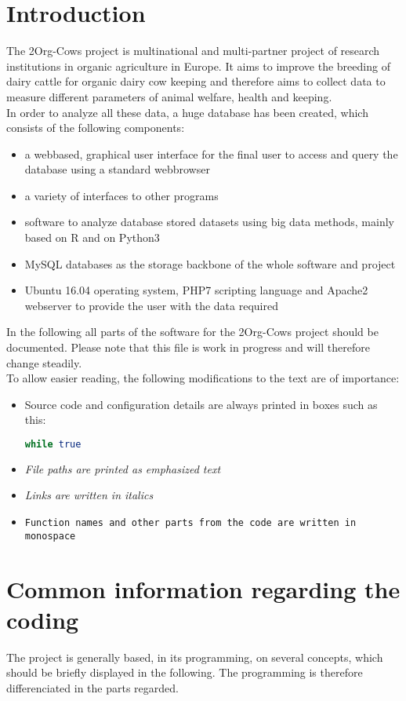 
\chapter{Introduction}

The 2Org-Cows project is multinational and multi-partner project of research institutions in organic agriculture in Europe. It aims to improve the breeding of dairy cattle for 
organic dairy cow keeping and therefore aims to collect data to measure different parameters of animal welfare, health and keeping.\\
In order to analyze all these data, a huge database has been created, which consists of the following components:
\begin{itemize}
 \item a webbased, graphical user interface for the final user to access and query the database using a standard webbrowser
 \item a variety of interfaces to other programs
 \item software to analyze database stored datasets using big data methods, mainly based on R and on Python3
 \item MySQL databases as the storage backbone of the whole software and project
 \item Ubuntu 16.04 operating system, PHP7 scripting language and Apache2 webserver to provide the user with the data required
\end{itemize}
In the following all parts of the software for the 2Org-Cows project should be documented. Please note that this file is work in progress and will therefore change steadily.\\
To allow easier reading, the following modifications to the text are of importance:
\begin{itemize}
\item Source code and configuration details are always printed in boxes such as this: 
  \begin{lstlisting}[language=bash] 
  while true 
  \end{lstlisting}
\item \emph{File paths are printed as emphasized text}
\item \textit{Links are written in italics}
\item \texttt{Function names and other parts from the code are written in monospace}
\end{itemize}

\chapter{Common information regarding the coding}
The project is generally based, in its programming, on several concepts, which should be briefly displayed in the following. The programming is therefore differenciated in the 
parts regarded. 
